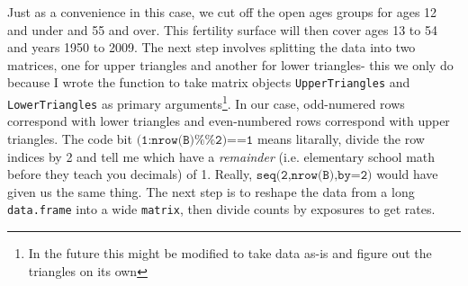 \documentclass[a4paper]{article}
\begin{document}
Just as a convenience in this case, we cut off the open ages groups for ages 12 and under and 55 and over. This fertility surface will then cover ages 13 to 54 and years 1950 to 2009. The next step involves splitting the data into two matrices, one for upper triangles and another for lower triangles- this we only do because I wrote the function to take matrix objects \texttt{UpperTriangles} and \texttt{LowerTriangles} as primary arguments\footnote{In the future this might be modified to take data as-is and figure out the triangles on its own}. In our case, odd-numered rows correspond with lower triangles and even-numbered rows correspond with upper triangles. The code bit $\texttt{(1:nrow(B)\%\%2)==1}$ means litarally, divide the row indices by 2 and tell me which have a \textit{remainder} (i.e. elementary school math before they teach you decimals) of 1. Really, $\texttt{seq(2,nrow(B),by=2)}$ would have given us the same thing. The next step is to reshape the data from a long \texttt{data.frame} into a wide \texttt{matrix}, then divide counts by exposures to get rates.
\end{document}
